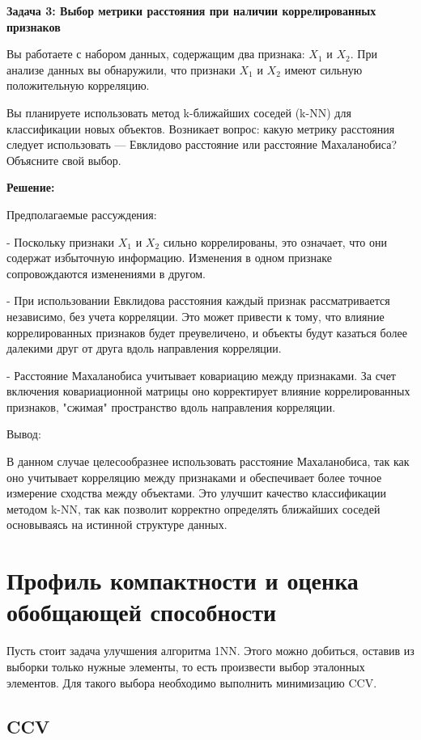 \textbf{Задача 3: Выбор метрики расстояния при наличии коррелированных признаков}

Вы работаете с набором данных, содержащим два признака: \( X_1 \) и \( X_2 \). При анализе данных вы обнаружили, что признаки \( X_1 \) и \( X_2 \) имеют сильную положительную корреляцию.

Вы планируете использовать метод k-ближайших соседей (k-NN) для классификации новых объектов. Возникает вопрос: какую метрику расстояния следует использовать — Евклидово расстояние или расстояние Махаланобиса? Объясните свой выбор.

\textbf{Решение:}

Предполагаемые рассуждения:

  - Поскольку признаки \( X_1 \) и \( X_2 \) сильно коррелированы, это означает, что они содержат избыточную информацию. Изменения в одном признаке сопровождаются изменениями в другом.

- При использовании Евклидова расстояния каждый признак рассматривается независимо, без учета корреляции. Это может привести к тому, что влияние коррелированных признаков будет преувеличено, и объекты будут казаться более далекими друг от друга вдоль направления корреляции.

- Расстояние Махаланобиса учитывает ковариацию между признаками. За счет включения ковариационной матрицы оно корректирует влияние коррелированных признаков, "сжимая" пространство вдоль направления корреляции.

Вывод:

В данном случае целесообразнее использовать расстояние Махаланобиса, так как оно учитывает корреляцию между признаками и обеспечивает более точное измерение сходства между объектами. Это улучшит качество классификации методом k-NN, так как позволит корректно определять ближайших соседей основываясь на истинной структуре данных.


\newpage

\section{Профиль компактности и оценка обобщающей способности}

Пусть стоит задача улучшения алгоритма 1NN. Этого можно добиться, оставив из выборки только нужные  элементы, то есть произвести выбор эталонных элементов. Для такого выбора необходимо выполнить минимизацию CCV.


\subsection{CCV}

